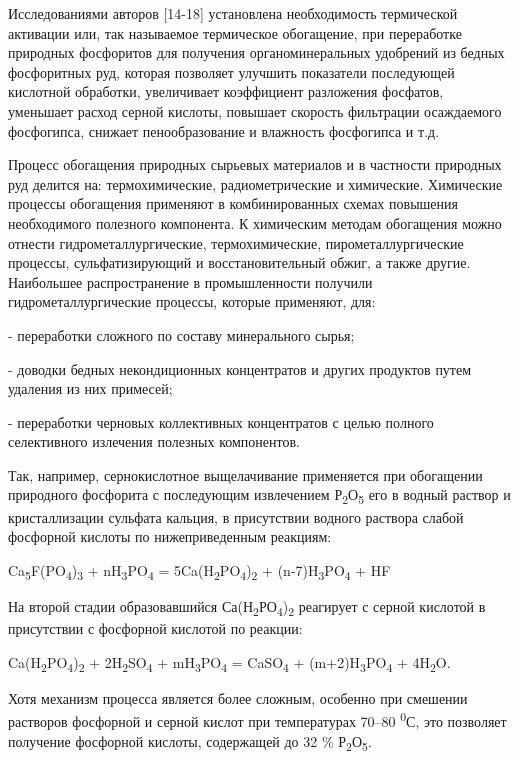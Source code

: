 Исследованиями авторов {[}14-18{]} установлена необходимость термической
активации или, так называемое термическое обогащение, при переработке
природных фосфоритов для получения органоминеральных удобрений из бедных
фосфоритных руд, которая позволяет улучшить показатели последующей
кислотной обработки, увеличивает коэффициент разложения фосфатов,
уменьшает расход серной кислоты, повышает скорость фильтрации
осаждаемого фосфогипса, снижает пенообразование и влажность фосфогипса и
т.д.

Процесс обогащения природных сырьевых материалов и в частности природных
руд делится на: термохимические, радиометрические и химические.
Химические процессы обогащения применяют в комбинированных схемах
повышения необходимого полезного компонента. К химическим методам
обогащения можно отнести гидрометаллургические, термохимические,
пирометаллургические процессы, сульфатизирующий и восстановительный
обжиг, а также другие. Наибольшее распространение в промышленности
получили гидрометаллургические процессы, которые применяют, для:

- переработки сложного по составу минерального сырья;

- доводки бедных некондиционных концентратов и других продуктов путем
удаления из них примесей;

- переработки черновых коллективных концентратов с целью полного
селективного излечения полезных компонентов.

Так, например, сернокислотное выщелачивание применяется при обогащении
природного фосфорита с последующим извлечением
Р\textsubscript{2}О\textsubscript{5} его в водный раствор и
кристаллизации сульфата кальция, в присутствии водного раствора слабой
фосфорной кислоты по нижеприведенным реакциям:

Ca\textsubscript{5}F(PO\textsubscript{4})\textsubscript{3} +
nH\textsubscript{3}PO\textsubscript{4} =
5Ca(H\textsubscript{2}PO\textsubscript{4})\textsubscript{2} +
(n-7)H\textsubscript{3}PO\textsubscript{4} + HF

На второй стадии образовавшийся
Са(Н\textsubscript{2}РО\textsubscript{4})\textsubscript{2} реагирует с
серной кислотой в присутствии с фосфорной кислотой по реакции:

Ca(H\textsubscript{2}PO\textsubscript{4})\textsubscript{2} +
2H\textsubscript{2}SO\textsubscript{4} +
mH\textsubscript{3}PO\textsubscript{4} = CaSO\textsubscript{4} +
(m+2)H\textsubscript{3}PO\textsubscript{4} + 4H\textsubscript{2}O.

Хотя механизм процесса является более сложным, особенно при смешении
растворов фосфорной и серной кислот при температурах 70--80
\textsuperscript{0}С, это позволяет получение фосфорной кислоты,
содержащей до 32 \% Р\textsubscript{2}О\textsubscript{5}.

